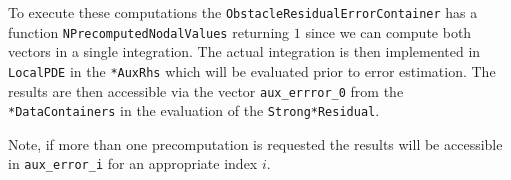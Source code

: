  To execute these computations the \texttt{ObstacleResidualErrorContainer}
 has a function \texttt{NPrecomputedNodalValues} returning $1$ since we
 can compute both vectors in a single integration. The actual
 integration is then implemented in \texttt{LocalPDE} in the
 \texttt{*AuxRhs} which will be evaluated prior to error estimation.
 The results are then accessible via the vector
 \texttt{aux\_errror\_0} from the \texttt{*DataContainers} in the
 evaluation of the \texttt{Strong*Residual}.

 Note, if more than one precomputation is requested the results will
 be accessible in \texttt{aux\_error\_i} for an appropriate index $i$.
 